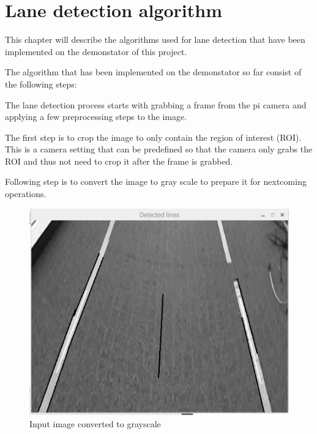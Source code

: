 

\section{Lane detection algorithm}


This chapter will describe the algorithms used for lane detection that have been implemented on the demonstator of this project. 

The algorithm that has been implemented on the demonstator so far consist of the following steps:

The lane detection process starts with grabbing a frame from the pi camera and applying a few preprocessing steps to the image. 

The first step is to crop the image to only contain the region of interest (ROI). This is a camera setting that can be predefined so that the camera only grabs the ROI and thus not need to crop it after the frame is grabbed.


Following step is to convert the image to gray scale to prepare it for nextcoming operations. 



\begin{figure}[H]
  \includegraphics[scale=0.7]{./img/gray.png}
  \centering
  \caption{Input image converted to grayscale}
  \label{fig:Input image converted to grayscale}
\end{figure}


